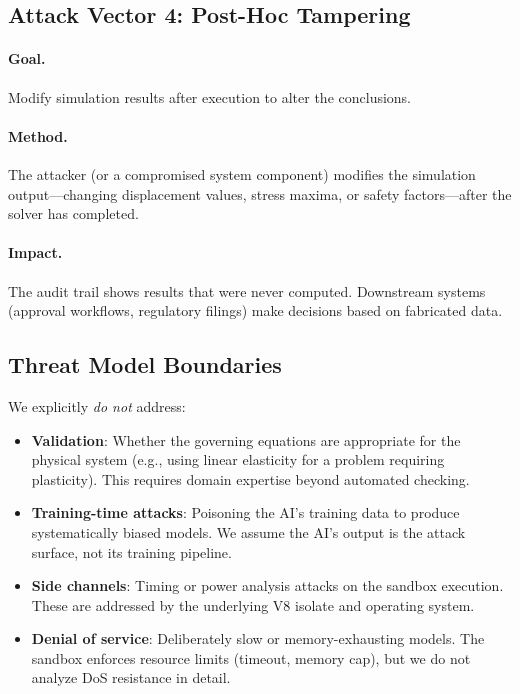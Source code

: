 \documentclass[letterpaper,twocolumn,10pt]{article}
\begin{document}
\subsection{Attack Vector 4: Post-Hoc Tampering}

\paragraph{Goal.} Modify simulation results after execution to
alter the conclusions.

\paragraph{Method.} The attacker (or a compromised system component)
modifies the simulation output---changing displacement values,
stress maxima, or safety factors---after the solver has completed.

\paragraph{Impact.} The audit trail shows results that were never
computed. Downstream systems (approval workflows, regulatory filings)
make decisions based on fabricated data.

\subsection{Threat Model Boundaries}

We explicitly \emph{do not} address:

\begin{itemize}[leftmargin=*,topsep=2pt,itemsep=1pt]
  \item \textbf{Validation}: Whether the governing equations are
    appropriate for the physical system (e.g., using linear elasticity
    for a problem requiring plasticity). This requires domain expertise
    beyond automated checking.
  \item \textbf{Training-time attacks}: Poisoning the AI's training data
    to produce systematically biased models. We assume the AI's output
    is the attack surface, not its training pipeline.
  \item \textbf{Side channels}: Timing or power analysis attacks on the
    sandbox execution. These are addressed by the underlying V8 isolate
    and operating system.
  \item \textbf{Denial of service}: Deliberately slow or memory-exhausting
    models. The sandbox enforces resource limits (timeout, memory cap),
    but we do not analyze DoS resistance in detail.
\end{itemize}
\end{document}

